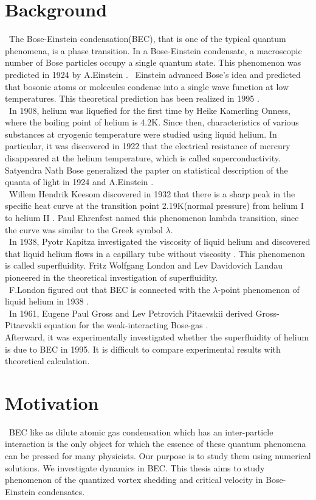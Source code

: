 \documentclass[12pt,a4paper]{report}
\begin{document}
\section{Background}
\ The Bose-Einstein condensation(BEC), that is one of the typical quantum phenomena,
is a phase transition.
In a Bose-Einstein condensate, a macroscopic number of
Bose particles occupy a single quantum state.
This phenomenon was predicted in 1924 by A.Einstein \cite{1} \cite{2}.
\ Einstein advanced Bose's idea and predicted that bosonic atoms or molecules
condense into a single wave function at low temperatures.
This theoretical prediction has been realized in 1995 \cite{3} \cite{4}.
\\
\ In 1908, helium was liquefied for the first time by Heike Kamerling Onness, 
where the boiling point of helium is 4.2K. 
Since then, characteristics of various substances at cryogenic temperature
were studied using liquid helium. 
In particular, it was discovered in 1922 that the electrical resistance of mercury
disappeared at the helium temperature, which is called superconductivity.
Satyendra Nath Bose generalized the papter on statistical description of the quanta of light in 1924 \cite{5} and A.Einstein \cite{6}.
\\
\ Willem Hendrik Keesom discovered in 1932 that there is a sharp peak 
in the specific heat curve at the transition point 2.19K(normal pressure) 
from helium I to helium II \cite{5}. Paul Ehrenfest named this phenomenon lambda transition,
since the curve was similar to the Greek symbol $\lambda$.
\\
\ In 1938, Pyotr Kapitza investigated the viscosity of liquid helium and 
discovered that liquid helium flows in a capillary tube without viscosity \cite{6}.
This phenomenon is called superfluidity. Fritz Wolfgang London and Lev Davidovich Landau pioneered 
in the theoretical investigation of superfluidity.
\\
\ F.London figured out that BEC is connected with 
the $\lambda$-point phenomenon of liquid helium in 1938 \cite{7}.
\\
\ In 1961, Eugene Paul Gross and Lev Petrovich Pitaevskii derived Gross-Pitaevskii equation for the weak-interacting Bose-gas
\cite{8} \cite{9}.
\\ Afterward, it was experimentally investigated whether the superfluidity of helium is due to BEC in 1995\cite{10}\cite{11}\cite{12}.
It is difficult to compare experimental results with theoretical calculation. 

\section{Motivation}
\ BEC like as dilute atomic gas condensation which has an inter-particle interaction
is the only object for which the essence of 
these quantum phenomena can be pressed for many physicists.
Our purpose is to study them using numerical solutions.
We investigate dynamics in BEC.
This thesis aims to study phenomenon of the quantized vortex shedding
and critical velocity in Bose-Einstein condensates.
\end{document}
